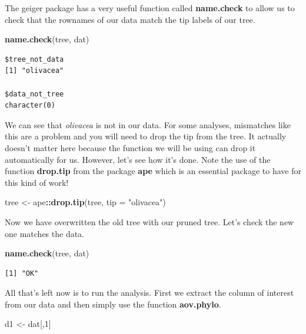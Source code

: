 \documentclass[
]{book}
\newenvironment{Shaded}{\begin{snugshade}}{\end{snugshade}}
\newcommand{\DataTypeTok}[1]{\textcolor[rgb]{0.13,0.29,0.53}{#1}}
\newcommand{\DecValTok}[1]{\textcolor[rgb]{0.00,0.00,0.81}{#1}}
\newcommand{\KeywordTok}[1]{\textcolor[rgb]{0.13,0.29,0.53}{\textbf{#1}}}
\newcommand{\NormalTok}[1]{#1}
\newcommand{\OperatorTok}[1]{\textcolor[rgb]{0.81,0.36,0.00}{\textbf{#1}}}
\newcommand{\StringTok}[1]{\textcolor[rgb]{0.31,0.60,0.02}{#1}}
\begin{document}
The geiger package has a very useful function called \textbf{name.check} to allow us to check that the rownames of our data match the tip labels of our tree.

\begin{Shaded}
\begin{Highlighting}[]
\KeywordTok{name.check}\NormalTok{(tree, dat)}
\end{Highlighting}
\end{Shaded}

\begin{verbatim}
$tree_not_data
[1] "olivacea"

$data_not_tree
character(0)
\end{verbatim}

We can see that \emph{olivacea} is not in our data. For some analyses, mismatches like this are a problem and you will need to drop the tip from the tree. It actually doesn't matter here because the function we will be using can drop it automatically for us. However, let's see how it's done. Note the use of the function \textbf{drop.tip} from the package \textbf{ape} \citep{ape} which is an essential package to have for this kind of work!

\begin{Shaded}
\begin{Highlighting}[]
\NormalTok{tree \textless{}{-}}\StringTok{ }\NormalTok{ape}\OperatorTok{::}\KeywordTok{drop.tip}\NormalTok{(tree, }\DataTypeTok{tip =} \StringTok{"olivacea"}\NormalTok{)}
\end{Highlighting}
\end{Shaded}

Now we have overwritten the old tree with our pruned tree. Let's check the new one matches the data.

\begin{Shaded}
\begin{Highlighting}[]
\KeywordTok{name.check}\NormalTok{(tree, dat)}
\end{Highlighting}
\end{Shaded}

\begin{verbatim}
[1] "OK"
\end{verbatim}

All that's left now is to run the analysis. First we extract the column of interest from our data and then simply use the function \textbf{aov.phylo}.

\begin{Shaded}
\begin{Highlighting}[]
\NormalTok{d1 \textless{}{-}}\StringTok{ }\NormalTok{dat[,}\DecValTok{1}\NormalTok{]}
\end{Highlighting}
\end{Shaded}
\end{document}
